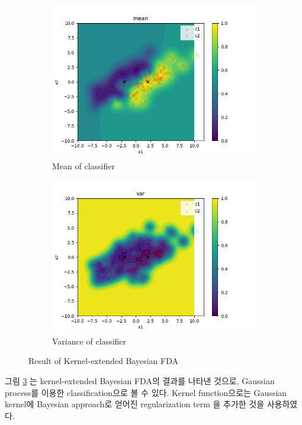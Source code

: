 \documentclass{article} %
\begin{document}
\begin{figure}[ht]
	\begin{subfigure}{.5\textwidth}
		\centering
		\includegraphics[width=\textwidth]{Kernel_1.png}
		\caption{Mean of classifier}
		\label{fg:ker1}
	\end{subfigure}
	\begin{subfigure}{.5\textwidth}
		\centering
		\includegraphics[width=\textwidth]{Kernel_2.png}
		\caption{Variance of classifier}
		\label{fg:ker2}
	\end{subfigure}
	\caption{Result of Kernel-extended Bayesian FDA}
	\label{fg:kernels}
\end{figure}

그림 \ref{fg:kernels} 는 kernel-extended Bayesian FDA의 결과를 나타낸 것으로, Gaussian process를 이용한 classification으로 볼 수 있다. Kernel function으로는 Gaussian kernel에 Bayesian approach로 얻어진 regularization term 을 추가한 것을 사용하였다. \\
\end{document}
